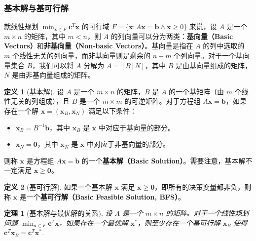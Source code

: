 \documentclass[12pt]{article}
\theoremstyle{plain}
\newtheorem{thm}{定理}[subsection]
\theoremstyle{definition}
\newtheorem{dfn}{定义}[subsection]
\begin{document}
\subsubsection{基本解与基可行解}\label{subsubsec:basic_solutions}

就线性规划 $\displaystyle \min_{\bm{x} \in F} \bm{c}^T \bm{x}$ 的可行域 $F = \{\bm{x} : A\bm{x} = \bm{b} \land \bm{x} \geq 0\}$ 来说，设 $A$ 是一个 $m \times n$ 的矩阵，其中 $m < n$，则 $A$ 的列向量可以分为两类：\textbf{基向量（Basic Vectors）}和\textbf{非基向量（Non-basic Vectors）}。基向量是指在 $A$ 的列中选取的 $m$ 个线性无关的列向量，而非基向量则是剩余的 $n-m$ 个列向量。对于一个基向量集合 $B$，我们可以将 $A$ 分解为 $A = [B \,|\, N]$，其中 $B$ 是由基向量组成的矩阵，$N$ 是由非基向量组成的矩阵。
\begin{dfn}[基本解]
    设 $A$ 是一个 $m \times n$ 的矩阵，$B$ 是 $A$ 的一个基矩阵（由 $m$ 个线性无关的列组成），且 $B$ 是一个 $m \times m$ 的可逆矩阵。对于方程组 $A\bm{x} = \bm{b}$，如果存在一个解 $\bm{x} = (\bm{x}_B, \bm{x}_N)$ 满足以下条件：
    \begin{itemize}
        \item $\bm{x}_B = B^{-1} \bm{b}$，其中 $\bm{x}_B$ 是 $\bm{x}$ 中对应于基向量的部分。
        \item $\bm{x}_N = \bm{0}$，其中 $\bm{x}_N$ 是 $\bm{x}$ 中对应于非基向量的部分。
    \end{itemize}
    则称 $\bm{x}$ 是方程组 $A\bm{x} = \bm{b}$ 的一个\textbf{基本解（Basic Solution）}。需要注意，基本解不一定满足 $\bm{x} \geq \bm{0}$。
\end{dfn}
\begin{dfn}[基可行解]
    如果一个基本解 $\bm{x}$ 满足 $\bm{x} \geq \bm{0}$，即所有的决策变量都非负，则称 $\bm{x}$ 是一个\textbf{基可行解（Basic Feasible Solution, BFS）}。
\end{dfn}
\begin{thm}[基本解与最优解的关系]
    设 $A$ 是一个 $m \times n$ 的矩阵。对于一个线性规划问题 $\displaystyle \min_{\bm{x} \in F} \bm{c}^T \bm{x}$，如果存在一个最优解 $\bm{x}^*$，则至少存在一个基可行解 $\bm{x}_B$ 使得 $\bm{c}^T \bm{x}_B = \bm{c}^T \bm{x}^*$.
\end{thm}
\end{document}
